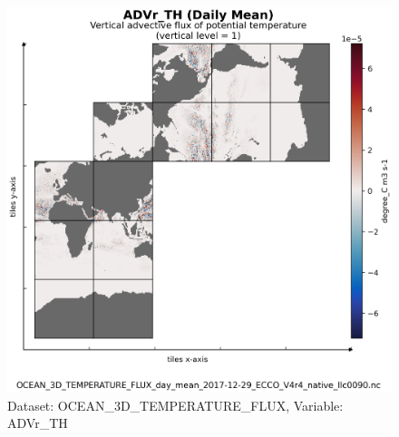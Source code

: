 \begin{figure}[H]
\centering
\includegraphics[scale=0.55]{../images/plots/v4r4/native_plots/Ocean_Three-Dimensional_Potential_Temperature_Fluxes/ADVr_TH.png}
\caption{Dataset: OCEAN\_3D\_TEMPERATURE\_FLUX, Variable: ADVr\_TH}
\label{tab:table-OCEAN_3D_TEMPERATURE_FLUX_ADVr_TH-Plot}
\end{figure}
\newpage
\pagebreak
